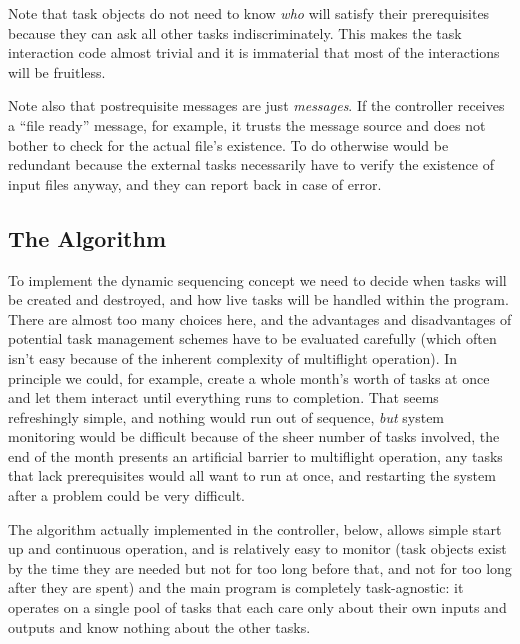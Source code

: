 \documentclass[12pt]{amsart}
\begin{document}
Note that task objects do not need to know {\em who} will satisfy their
prerequisites because they can ask all other tasks indiscriminately.
This makes the task interaction code almost trivial and it is immaterial
that most of the interactions will be fruitless. 

Note also that postrequisite messages are just {\em messages}. If the
controller receives a ``file ready'' message, for example, it trusts the
message source and does not bother to check for the actual file's
existence. To do otherwise would be redundant because the external tasks
necessarily have to verify the existence of input files anyway, and they
can report back in case of error.


\subsection{The Algorithm}

To implement the dynamic sequencing concept we need to decide when tasks
will be created and destroyed, and how live tasks will be handled within
the program.  There are almost too many choices here, and the advantages
and disadvantages of potential task management schemes have to be
evaluated carefully (which often isn't easy because of the inherent
complexity of multiflight operation). In principle we could, for
example, create a whole month's worth of tasks at once and let them
interact until everything runs to completion.  That seems refreshingly
simple, and nothing would run out of sequence, {\em but} system
monitoring would be difficult because of the sheer number of tasks
involved, the end of the month presents an artificial barrier to
multiflight operation, any tasks that lack prerequisites would all want
to run at once, and restarting the system after a problem could be very
difficult. 

The algorithm actually implemented in the controller, below, allows
simple start up and continuous operation, and is relatively easy to
monitor (task objects exist by the time they are needed but not for too
long before that, and not for too long after they are spent) and the
main program is completely task-agnostic: it operates on a single pool
of tasks that each care only about their own inputs and outputs and
know nothing about the other tasks.  
\end{document}
